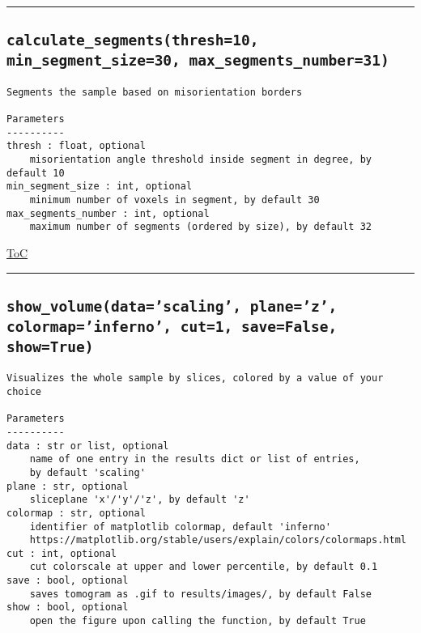\documentclass{article}
\begin{document}


\vspace{5mm}

\hrule

\subsection*{\texttt{calculate\_segments(thresh=10, min\_segment\_size=30, max\_segments\_number=31)}}

\begin{lstlisting}[language=docstring]
Segments the sample based on misorientation borders

Parameters
----------
thresh : float, optional
    misorientation angle threshold inside segment in degree, by default 10
min_segment_size : int, optional
    minimum number of voxels in segment, by default 30
max_segments_number : int, optional
    maximum number of segments (ordered by size), by default 32
\end{lstlisting}

\begin{flushright}

\hyperref[toc]{ToC}

\end{flushright}



\vspace{5mm}

\hrule

\subsection*{\texttt{show\_volume(data='scaling', plane='z', colormap='inferno', cut=1, save=False, show=True)}}

\begin{lstlisting}[language=docstring]
Visualizes the whole sample by slices, colored by a value of your choice

Parameters
----------
data : str or list, optional
    name of one entry in the results dict or list of entries, 
    by default 'scaling'
plane : str, optional
    sliceplane 'x'/'y'/'z', by default 'z'
colormap : str, optional
    identifier of matplotlib colormap, default 'inferno'
    https://matplotlib.org/stable/users/explain/colors/colormaps.html
cut : int, optional
    cut colorscale at upper and lower percentile, by default 0.1
save : bool, optional
    saves tomogram as .gif to results/images/, by default False
show : bool, optional
    open the figure upon calling the function, by default True
\end{lstlisting}
\end{document}
